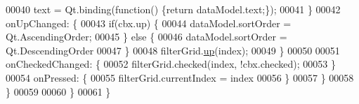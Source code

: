 \begin{DoxyCode}
00040                     text = Qt.binding(\textcolor{keyword}{function}() \{\textcolor{keywordflow}{return} dataModel.text;\});
00041                 \}
00042                 onUpChanged: \{
00043                     \textcolor{keywordflow}{if}(cbx.up) \{
00044                         dataModel.sortOrder = Qt.AscendingOrder;
00045                     \} \textcolor{keywordflow}{else} \{
00046                         dataModel.sortOrder = Qt.DescendingOrder
00047                     \}
00048                     filterGrid.\hyperlink{classSH__TriStateCheckImage_a8a6a37f71149d3f918f642fa9d3e432c}{up}(index);
00049                 \}
00050 
00051                 onCheckedChanged: \{
00052                     filterGrid.checked(index, !cbx.checked);
00053                 \}
00054                 onPressed: \{
00055                     filterGrid.currentIndex = index
00056                 \}
00057             \}
00058         \}
00059 
00060     \}
00061 \}
\end{DoxyCode}
